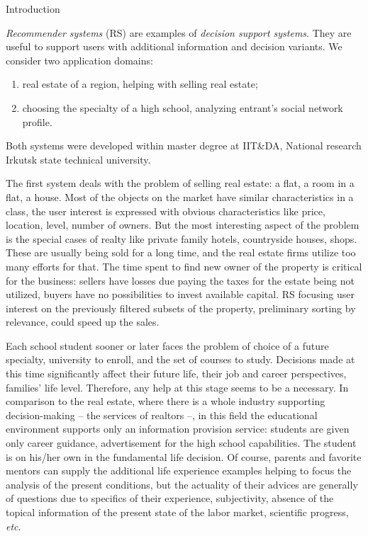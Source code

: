 \documentclass[10pt,dvipsnames]{beamer}
\begin{document}
\begin{frame}{Introduction}

  \emph{Recommender systems} (RS) are examples of \emph{decision support systems}. They are useful to support users with additional information and decision variants.  We consider two application domains:
  \begin{enumerate}
  \item real estate of a region, helping with selling real estate;
  \item choosing the specialty of a high school, analyzing entrant's social network profile.
\end{enumerate}
Both systems were developed within master degree at IIT\&DA, National research Irkutsk state technical university.



The first system deals with the problem of selling real estate: a flat, a room in a flat, a house.  Most of the objects on the market have similar characteristics in a class, the user interest is expressed with obvious characteristics like price, location, level, number of owners.  But the most interesting aspect of the problem is the special cases of realty like private family hotels, countryside houses, shops.  These are usually being sold for a long time, and the real estate firms utilize too many efforts for that.  The time spent to find new owner of the property is critical for the business: sellers have losses due paying the taxes for the estate being not utilized, buyers have no possibilities to invest available capital.   RS focusing user interest on the previously filtered subsets of the property, preliminary sorting by relevance, could speed up the sales.

Each school student sooner or later faces the problem of choice of a future specialty, university to enroll, and the set of courses to study.  Decisions made at this time significantly affect their future life, their job and career perspectives, families' life level.  Therefore, any help at this stage seems to be a necessary. In comparison to the real estate, where there is a whole industry supporting decision-making -- the services of realtors --, in this field the educational environment supports only an information provision service: students are given only career guidance, advertisement for the high school capabilities.  The student is on his/her own in the fundamental life decision.  Of course, parents and favorite mentors can supply the additional life experience examples helping to focus the analysis of the present conditions, but the actuality of their advices are generally of questions due to specifics of their experience, subjectivity, absence of the topical information of the present state of the labor market, scientific progress, \emph{etc}.
\end{frame}
\end{document}
